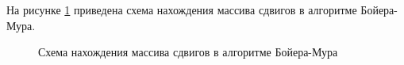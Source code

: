 \documentclass[a4paper, 14pt]{article}
\begin{document}
        На рисунке \ref{fig:shift} приведена схема нахождения массива сдвигов в алгоритме Бойера-Мура.\\
       \begin{figure}[h]
        	\caption{Схема нахождения массива сдвигов в алгоритме Бойера-Мура}
        	\label{fig:shift}
        \end{figure} 
        \newpage   
       
\end{document}
